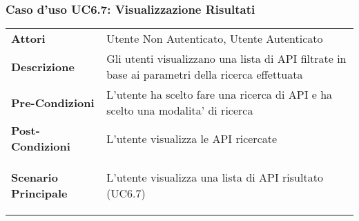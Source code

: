\subsubsection{Caso d'uso UC6.7:  Visualizzazione Risultati}
\label{UC6_7}

\begin{tabular}{ l | p{11cm}}
	\hline
	\rowcolor{Gray}
	 \multicolumn{2}{c}{UC6.7 - Visualizzazione Risultati} \\
	 \hline
	\textbf{Attori} & Utente Non Autenticato, Utente Autenticato \\
	\textbf{Descrizione} & Gli utenti visualizzano una lista di API filtrate in base ai parametri della ricerca effettuata\\
	\textbf{Pre-Condizioni} & L'utente ha scelto fare una ricerca di API e ha scelto una modalita' di ricerca\\
	\textbf{Post-Condizioni} & L'utente visualizza le API ricercate \\
	\textbf{Scenario Principale} & 
	\begin{enumerate*}[label=(\arabic*.),itemjoin={\newline}]
		\item L'utente visualizza una lista di API risultato (UC6.7)
	\end{enumerate*}\\
\end{tabular}